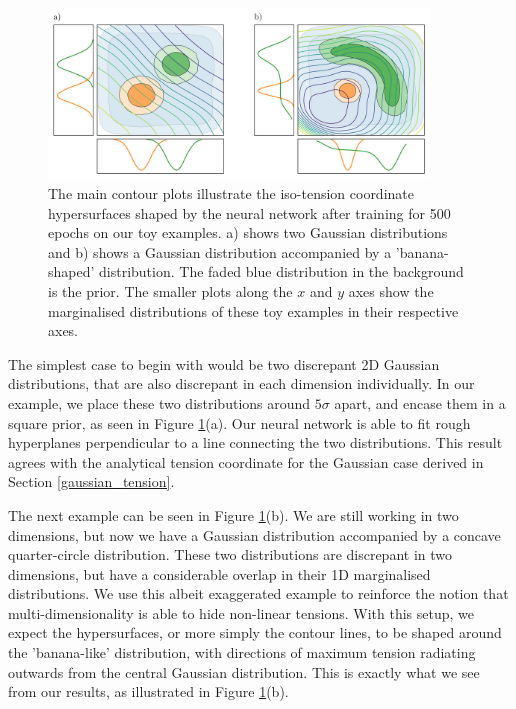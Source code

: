 \documentclass[%
 reprint,
 amsmath,amssymb,
 aps,
]{revtex4-2}
\begin{document}
\begin{figure}
    \includegraphics[width=0.9\textwidth]{../plots/toy_wide.png}
    \centering
    \caption{The main contour plots illustrate the iso-tension coordinate hypersurfaces shaped by the neural network after training for 500 epochs on our toy examples. a) shows two Gaussian distributions and b) shows a Gaussian distribution accompanied by a 'banana-shaped' distribution. The faded blue distribution in the background is the prior. The smaller plots along the $x$ and $y$ axes show the marginalised distributions of these toy examples in their respective axes.}
    \label{fig:toy}
\end{figure}

The simplest case to begin with would be two discrepant 2D Gaussian distributions, that are also discrepant in each dimension individually. In our example, we place these two distributions around $5\sigma$ apart, and encase them in a square prior, as seen in Figure \ref{fig:toy}(a).  Our neural network is able to fit rough hyperplanes perpendicular to a line connecting the two distributions. This result agrees with the analytical tension coordinate for the Gaussian case derived in Section \ref{gaussian_tension}.

The next example can be seen in Figure \ref{fig:toy}(b). We are still working in two dimensions, but now we have a Gaussian distribution accompanied by a concave quarter-circle distribution. These two distributions are discrepant in two dimensions, but have a considerable overlap in their 1D marginalised distributions. We use this albeit exaggerated example to reinforce the notion that multi-dimensionality is able to hide non-linear tensions. With this setup, we expect the hypersurfaces, or more simply the contour lines, to be shaped around the 'banana-like' distribution, with directions of maximum tension radiating outwards from the central Gaussian distribution. This is exactly what we see from our results, as illustrated in Figure \ref{fig:toy}(b).
\end{document}
